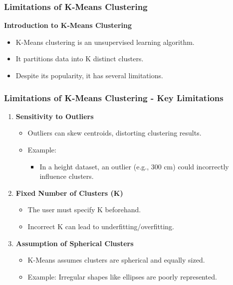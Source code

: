 \documentclass[aspectratio=169]{beamer}
\begin{document}
\begin{frame}[fragile]
    \frametitle{Limitations of K-Means Clustering}
    \textbf{Introduction to K-Means Clustering}
    \begin{itemize}
        \item K-Means clustering is an unsupervised learning algorithm.
        \item It partitions data into K distinct clusters.
        \item Despite its popularity, it has several limitations.
    \end{itemize}
\end{frame}

\begin{frame}[fragile]
    \frametitle{Limitations of K-Means Clustering - Key Limitations}
    \begin{enumerate}
        \item \textbf{Sensitivity to Outliers}
        \begin{itemize}
            \item Outliers can skew centroids, distorting clustering results.
            \item Example: 
            \begin{itemize}
                \item In a height dataset, an outlier (e.g., 300 cm) could incorrectly influence clusters.
            \end{itemize}
        \end{itemize}
        
        \item \textbf{Fixed Number of Clusters (K)}
        \begin{itemize}
            \item The user must specify K beforehand.
            \item Incorrect K can lead to underfitting/overfitting.
        \end{itemize}
        
        \item \textbf{Assumption of Spherical Clusters}
        \begin{itemize}
            \item K-Means assumes clusters are spherical and equally sized.
            \item Example: Irregular shapes like ellipses are poorly represented.
        \end{itemize}
    \end{enumerate}
\end{frame}
\end{document}
